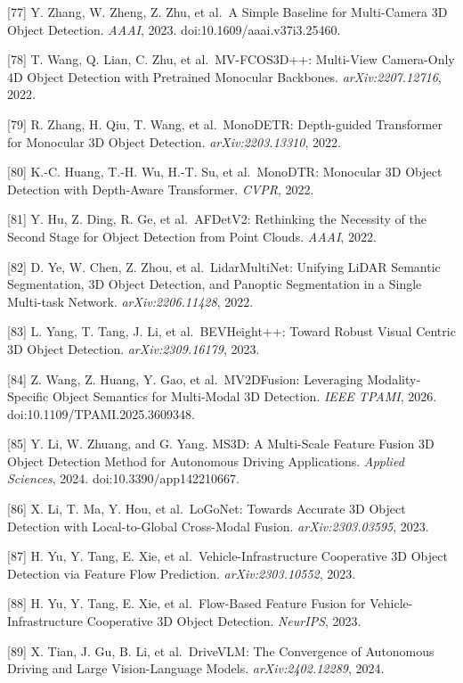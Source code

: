 {[}77{]} Y. Zhang, W. Zheng, Z. Zhu, et al.~A Simple Baseline for Multi-Camera 3D Object Detection. \emph{AAAI}, 2023. doi:10.1609/aaai.v37i3.25460.

{[}78{]} T. Wang, Q. Lian, C. Zhu, et al.~MV-FCOS3D++: Multi-View Camera-Only 4D Object Detection with Pretrained Monocular Backbones. \emph{arXiv:2207.12716}, 2022.

{[}79{]} R. Zhang, H. Qiu, T. Wang, et al.~MonoDETR: Depth-guided Transformer for Monocular 3D Object Detection. \emph{arXiv:2203.13310}, 2022.

{[}80{]} K.-C. Huang, T.-H. Wu, H.-T. Su, et al.~MonoDTR: Monocular 3D Object Detection with Depth-Aware Transformer. \emph{CVPR}, 2022.

{[}81{]} Y. Hu, Z. Ding, R. Ge, et al.~AFDetV2: Rethinking the Necessity of the Second Stage for Object Detection from Point Clouds. \emph{AAAI}, 2022.

{[}82{]} D. Ye, W. Chen, Z. Zhou, et al.~LidarMultiNet: Unifying LiDAR Semantic Segmentation, 3D Object Detection, and Panoptic Segmentation in a Single Multi-task Network. \emph{arXiv:2206.11428}, 2022.

{[}83{]} L. Yang, T. Tang, J. Li, et al.~BEVHeight++: Toward Robust Visual Centric 3D Object Detection. \emph{arXiv:2309.16179}, 2023.

{[}84{]} Z. Wang, Z. Huang, Y. Gao, et al.~MV2DFusion: Leveraging Modality-Specific Object Semantics for Multi-Modal 3D Detection. \emph{IEEE TPAMI}, 2026. doi:10.1109/TPAMI.2025.3609348.

{[}85{]} Y. Li, W. Zhuang, and G. Yang. MS3D: A Multi-Scale Feature Fusion 3D Object Detection Method for Autonomous Driving Applications. \emph{Applied Sciences}, 2024. doi:10.3390/app142210667.

{[}86{]} X. Li, T. Ma, Y. Hou, et al.~LoGoNet: Towards Accurate 3D Object Detection with Local-to-Global Cross-Modal Fusion. \emph{arXiv:2303.03595}, 2023.

{[}87{]} H. Yu, Y. Tang, E. Xie, et al.~Vehicle-Infrastructure Cooperative 3D Object Detection via Feature Flow Prediction. \emph{arXiv:2303.10552}, 2023.

{[}88{]} H. Yu, Y. Tang, E. Xie, et al.~Flow-Based Feature Fusion for Vehicle-Infrastructure Cooperative 3D Object Detection. \emph{NeurIPS}, 2023.

{[}89{]} X. Tian, J. Gu, B. Li, et al.~DriveVLM: The Convergence of Autonomous Driving and Large Vision-Language Models. \emph{arXiv:2402.12289}, 2024.

